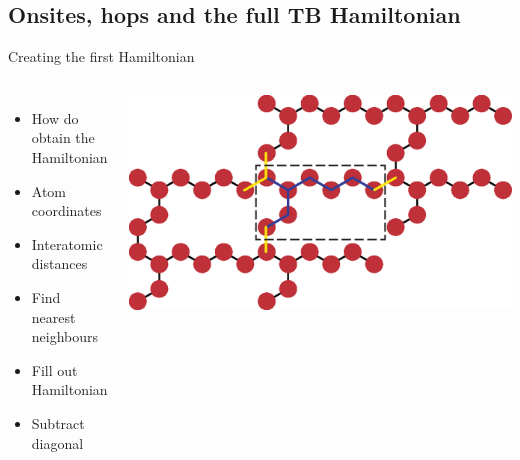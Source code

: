 \documentclass[hyperref={colorlinks=true,urlcolor=blue,linkcolor=.},aspectratio=1610,mathserif]{beamer}
\newcommand{\im}[3]{\inputminted[linenos=true, python3=true, firstline=#2, lastline=#3]{python}{#1}}
\begin{document}
\subsection{Onsites, hops and the full TB Hamiltonian}
\begin{frame}{Creating the first Hamiltonian}
	\begin{center}
		\begin{columns}[c]
			\begin{itemize}
		        \item How do obtain the Hamiltonian
				\item Atom coordinates
				\item Interatomic distances
				\item Find nearest neighbours 
				\item Fill out Hamiltonian 
				\item Subtract diagonal
			\end{itemize}
			\includegraphics[width=.6\textwidth]{Figures/atomreffig.eps}
		\end{columns}
	\end{center}
	\begin{columns}[t]\im{Listings/Functions.py}{33}{38}\end{columns}
\end{frame}
\end{document}
